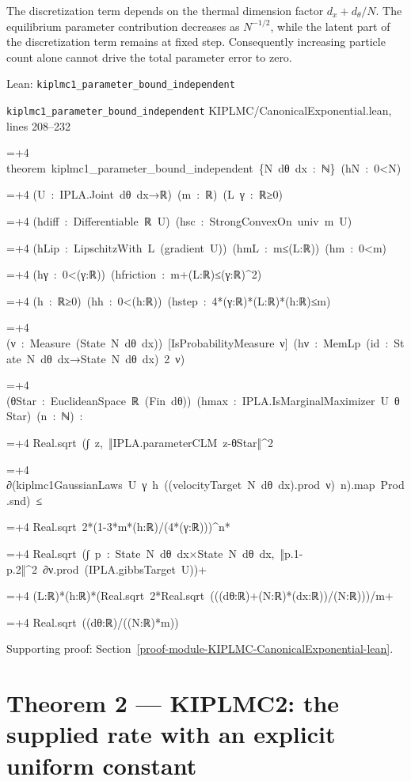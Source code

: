 \documentclass[11pt,a4paper]{report}
\newlength{\leancharwidth}
\newenvironment{leancode}{\par\smallskip\begingroup\ttfamily\footnotesize\raggedright
  \settowidth{\leancharwidth}{M}\setlength{\parskip}{0pt}\setlength{\parindent}{0pt}
  \frenchspacing}{\par\endgroup\smallskip}
\newcommand{\leanline}[2]{\hangindent=\dimexpr#1\leancharwidth+4\leancharwidth\relax
  \hangafter=1\noindent\hspace*{#1\leancharwidth}#2\par}
\newcommand{\leansource}[1]{\par{\footnotesize\color{leanmuted}#1}\par}
\begin{document}
The discretization term depends on the thermal dimension factor \(d_x+d_\theta/N\). The equilibrium parameter contribution decreases as \(N^{-1/2}\), while the latent part of the discretization term remains at fixed step. Consequently increasing particle count alone cannot drive the total parameter error to zero.

\begin{leanbox}{Lean: \texttt{kiplmc1\_\allowbreak{}parameter\_\allowbreak{}bound\_\allowbreak{}independent}}
\leansource{\texttt{kiplmc1\_\allowbreak{}parameter\_\allowbreak{}bound\_\allowbreak{}independent} \quad KIPLMC/\allowbreak{}CanonicalExponential.lean, lines 208–232}
\begin{leancode}
\leanline{0}{theorem\ kiplmc1\_parameter\_bound\_independent\ \{N\ dθ\ dx\ :\ ℕ\}\ (hN\ :\ 0<N)}
\leanline{4}{(U\ :\ IPLA.Joint\ dθ\ dx→ℝ)\ (m\ :\ ℝ)\ (L\ γ\ :\ ℝ≥0)}
\leanline{4}{(hdiff\ :\ Differentiable\ ℝ\ U)\ (hsc\ :\ StrongConvexOn\ univ\ m\ U)}
\leanline{4}{(hLip\ :\ LipschitzWith\ L\ (gradient\ U))\ (hmL\ :\ m≤(L:ℝ))\ (hm\ :\ 0<m)}
\leanline{4}{(hγ\ :\ 0<(γ:ℝ))\ (hfriction\ :\ m+(L:ℝ)≤(γ:ℝ)\textasciicircum{}2)}
\leanline{4}{(h\ :\ ℝ≥0)\ (hh\ :\ 0<(h:ℝ))\ (hstep\ :\ 4*(γ:ℝ)*(L:ℝ)*(h:ℝ)≤m)}
\leanline{4}{(ν\ :\ Measure\ (State\ N\ dθ\ dx))\ [IsProbabilityMeasure\ ν]\ (hν\ :\ MemLp\ (id\ :\ State\ N\ dθ\ dx→State\ N\ dθ\ dx)\ 2\ ν)}
\leanline{4}{(θStar\ :\ EuclideanSpace\ ℝ\ (Fin\ dθ))\ (hmax\ :\ IPLA.IsMarginalMaximizer\ U\ θStar)\ (n\ :\ ℕ)\ :}
\leanline{4}{Real.sqrt\ (∫\ z,\ ‖IPLA.parameterCLM\ z-θStar‖\textasciicircum{}2}
\leanline{6}{∂(kiplmc1GaussianLaws\ U\ γ\ h\ ((velocityTarget\ N\ dθ\ dx).prod\ ν)\ n).map\ Prod.snd)\ ≤}
\leanline{6}{Real.sqrt\ 2*(1-3*m*(h:ℝ)/(4*(γ:ℝ)))\textasciicircum{}n*}
\leanline{8}{Real.sqrt\ (∫\ p\ :\ State\ N\ dθ\ dx×State\ N\ dθ\ dx,\ ‖p.1-p.2‖\textasciicircum{}2\ ∂ν.prod\ (IPLA.gibbsTarget\ U))+}
\leanline{6}{(L:ℝ)*(h:ℝ)*(Real.sqrt\ 2*Real.sqrt\ (((dθ:ℝ)+(N:ℝ)*(dx:ℝ))/(N:ℝ)))/m+}
\leanline{6}{Real.sqrt\ ((dθ:ℝ)/((N:ℝ)*m))}
\end{leancode}
\end{leanbox}

{\small\color{gray}Supporting proof: Section~\ref{proof-module-KIPLMC-CanonicalExponential-lean}.\par}
\section{\texorpdfstring{Theorem 2 — KIPLMC2: the supplied rate with an explicit uniform constant}{Theorem 2 — KIPLMC2: the supplied rate with an explicit uniform constant}}
\end{document}
